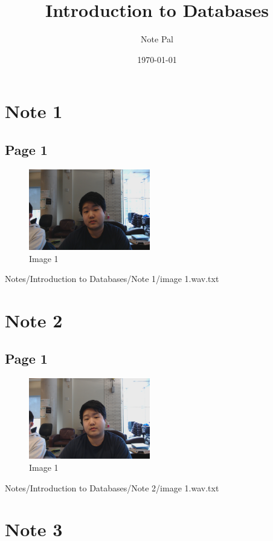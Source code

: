 \documentclass{article}%
\title{Introduction to Databases}%
\author{Note Pal}%
\date{\today}%
\begin{document}
%
\normalsize%
\maketitle%
\section{Note 1}%
\label{sec:Note 1}%
\subsection{Page 1}%
\label{subsec:Page 1}%


\begin{figure}[h!]%
\centering%
\includegraphics[width=200px]{Notes/Introduction to Databases/Note 1/image 1.jpg}%
\caption{Image 1}%
\end{figure}

%
Notes/Introduction to Databases/Note 1/image 1.wav.txt

%
\section{Note 2}%
\label{sec:Note 2}%
\subsection{Page 1}%
\label{subsec:Page 1}%


\begin{figure}[h!]%
\centering%
\includegraphics[width=200px]{Notes/Introduction to Databases/Note 2/image 1.jpg}%
\caption{Image 1}%
\end{figure}

%
Notes/Introduction to Databases/Note 2/image 1.wav.txt

%
\section{Note 3}%
\label{sec:Note 3}%
\end{document}
